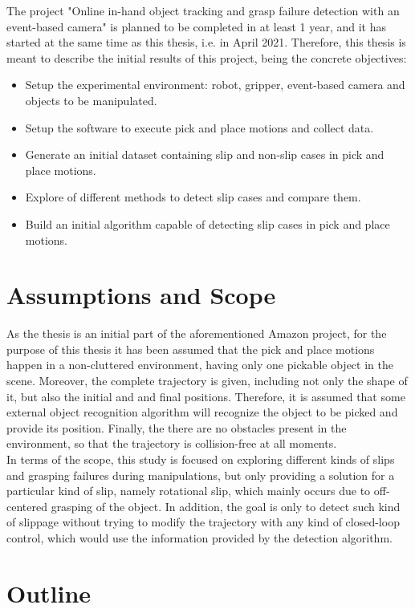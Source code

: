 The project "Online in-hand object tracking and grasp failure detection with an event-based camera" is planned to be completed in at least 1 year, and it has started at the same time as this thesis, i.e. in April 2021. Therefore, this thesis is meant to describe the initial results of this project, being the concrete objectives:

\begin{itemize}
	\item Setup the experimental environment: robot, gripper, event-based camera and objects to be manipulated.
	\item Setup the software to execute pick and place motions and collect data.
	\item Generate an initial dataset containing slip and non-slip cases in pick and place motions.
	\item Explore of different methods to detect slip cases and compare them.
	\item Build an initial algorithm capable of detecting slip cases in pick and place motions.
\end{itemize}

\section{Assumptions and Scope}

As the thesis is an initial part of the aforementioned Amazon project, for the purpose of this thesis it has been assumed that the pick and place motions happen in a non-cluttered environment, having only one pickable object in the scene. Moreover, the complete trajectory is given, including not only the shape of it, but also the initial and and final positions. Therefore, it is assumed that some external object recognition algorithm will recognize the object to be picked and provide its position. Finally, the there are no obstacles present in the environment, so that the trajectory is collision-free at all moments.\\

In terms of the scope, this study is focused on exploring different kinds of slips and grasping failures during manipulations, but only providing a solution for a particular kind of slip, namely rotational slip, which mainly occurs due to off-centered grasping of the object. In addition, the goal is only to detect such kind of slippage without trying to modify the trajectory with any kind of closed-loop control, which would use the information provided by the detection algorithm.

\section{Outline}

